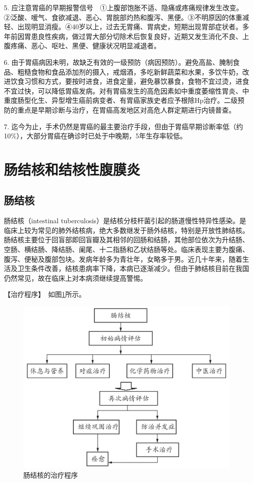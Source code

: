 5.
应注意胃癌的早期报警信号　①上腹部饱胀不适、隐痛或疼痛规律发生改变。②泛酸、嗳气、食欲减退、恶心、胃脘部灼热和腹泻、黑便。③不明原因的体重减轻、出现明显消瘦。④40岁以上，过去无胃痛、胃病史，短期出现胃部症状者。多年前因胃患良性疾病，做过胃大部分切除术后恢复良好，近期又发生消化不良、上腹疼痛、恶心、呕吐、黑便、健康状况明显减退者。

6.
由于胃癌病因未明，故缺乏有效的一级预防（病因预防）。避免高盐、腌制食品、粗糙食物和食品添加剂的摄入，戒烟酒，多吃新鲜蔬菜和水果，多饮牛奶，改进饮食习惯和方式，要按时进食，进食定量，避免暴饮暴食，食物不宜过烫，进食不宜过快，可以降低胃癌发病。对有胃癌发生的高危因素如中重度萎缩性胃炎、中重度肠型化生、异型增生癌前病变者、有胃癌家族史者应予根除Hp治疗。二级预防的重点是早期诊断与治疗，在胃癌高发地区对高危人群定期进行内镜普查。

7.
迄今为止，手术仍然是胃癌的最主要治疗手段，但由于胃癌早期诊断率低（约10\%），大部分胃癌在确诊时已处于中晚期，5年生存率较低。

\section{肠结核和结核性腹膜炎}

\subsection{肠结核}

肠结核（intestinal
tuberculosis）是结核分枝杆菌引起的肠道慢性特异性感染。是临床上较为常见的肺外结核病，绝大多数继发于肠外结核，特别是开放性肺结核。肠结核主要位于回盲部即回盲瓣及其相邻的回肠和结肠，其他部位依次为升结肠、空肠、横结肠、降结肠、阑尾、十二指肠和乙状结肠等处。临床表现主要为腹痛、腹泻、便秘及腹部包块。发病年龄多为青壮年，女略多于男。近几十年来，随着生活及卫生条件改善，结核患病率下降，本病已逐渐减少。但由于肺结核目前在我国仍然常见，故在临床上对本病须继续提高警惕。

【治疗程序】　如图\ref{fig3-5-1}所示。

\begin{figure}[!htbp]
 \centering
 \includegraphics{./images/Image00090.jpg}
 \captionsetup{justification=centering}
 \caption{肠结核的治疗程序}
 \label{fig3-5-1}
  \end{figure} 

